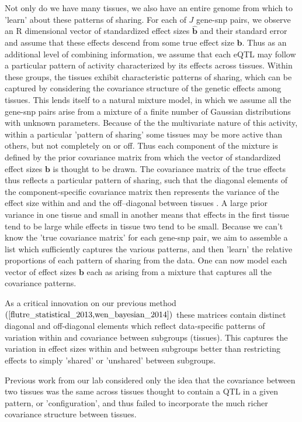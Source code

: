 \documentclass[10pt,letterpaper]{article}
\begin{document}
Not only do we have many tissues, we also have an entire genome from which to 'learn' about these patterns of sharing.  For each of $J$ gene-snp pairs, we observe an R dimensional vector of standardized effect sizes $\bm\hat{b}$ and their standard error and assume that these effects descend from some true effect size $\bm{b}$. Thus as an additional level of combining information, we assume that each eQTL may follow a particular pattern of activity characterized by its effects across tissues. Within these groups, the tissues exhibit characteristic patterns of sharing, which can be captured by considering the covariance structure of the genetic effects among tissues. This lends itself to a natural mixture model, in which  we assume all the gene-snp pairs arise from a mixture of a finite number of Gaussian distributions with unknown parameters. Because of the the multivariate nature of this activity, within a particular 'pattern of sharing' some tissues may be more active than others, but not completely on or off. Thus each component of the mixture is defined by the prior covariance matrix from which the vector of standardized effect sizes $\bm{b}$ is thought to be drawn. The covariance matrix of the true effects thus reflects a particular pattern of sharing, such that the diagonal elements of the component-specific covariance matrix then represents the variance of the effect size within and and the off--diagonal between tissues . A large prior variance in one tissue and small in another means that effects in the first tissue tend to be large while effects in tissue two tend to be small. Because we can't know the 'true covariance matrix' for each gene-snp pair, we aim to assemble a list which sufficiently captures the various patterns, and then 'learn' the relative proportions of each pattern of sharing from the data. One can now model each vector of effect sizes $\bm{b}$ each as arising from a mixture that captures all the covariance patterns.


As a critical innovation on our previous method $(\cite{flutre_statistical_2013,wen_bayesian_2014})$ these matrices contain distinct diagonal and off-diagonal elements which reflect data-specific patterns of variation within and covariance between subgroups (tissues). This captures the variation in effect sizes within and between subgroups better than restricting effects to simply 'shared' or 'unshared' between subgroups. 

Previous work from our lab considered only the idea that the covariance between two tissues was the same across tissues thought to contain a QTL in a given pattern, or 'configuration',  and thus failed to incorporate the much richer covariance structure between tissues. 
\end{document}
